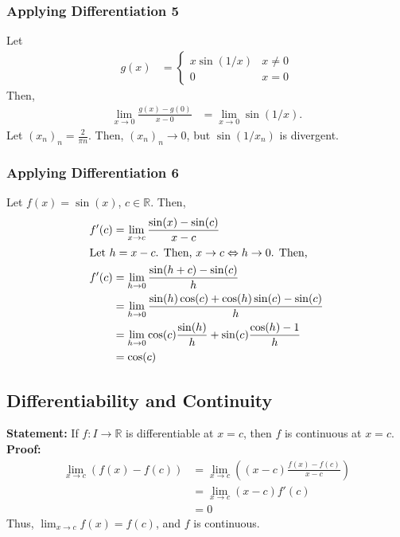 \documentclass[10pt]{extarticle}
\newcommand{\R}{\mathbb{R}}
\begin{document}
  \subsubsection{Applying Differentiation 5}%
    Let
    \begin{align*}
      g(x) &= \begin{cases}
        x\sin(1/x) & x\neq 0\\
        0 & x=0
      \end{cases}
    \end{align*}
    Then,
    \begin{align*}
      \lim_{x\rightarrow 0} \frac{g(x) - g(0)}{x-0} &= \lim_{x\rightarrow 0}\sin(1/x).
    \end{align*}
    Let $(x_n)_n = \frac{2}{\pi n}$. Then, $(x_n)_n \rightarrow 0$, but $\sin(1/x_n)$ is divergent.
  \subsubsection{Applying Differentiation 6}%
    Let $f(x) = \sin(x)$, $c\in\R$. Then,
    \begin{align*}
      f'(c) &= \lim_{x\rightarrow c} \frac{\sin(x) - \sin(c)}{x-c}\\
      \shortintertext{Let $h = x-c$. Then, $x\rightarrow c \Leftrightarrow h\rightarrow 0$. Then,}
      f'(c) &= \lim_{h\rightarrow 0}\frac{\sin(h+c) - \sin(c)}{h}\\
            &= \lim_{h\rightarrow 0}\frac{\sin(h)\cos(c) + \cos(h)\sin(c) - \sin(c)}{h}\\
            &= \lim_{h\rightarrow 0}\cos(c)\frac{\sin(h)}{h} + \sin(c)\frac{\cos(h) - 1}{h}\\
            &= \cos(c)
    \end{align*}
  \subsection{Differentiability and Continuity}%
    \textbf{Statement:} If $f: I\rightarrow \R$ is differentiable at $x=c$, then $f$ is continuous at $x=c$.\\

    \textbf{Proof:}
    \begin{align*}
      \lim_{x\rightarrow c}\left(f(x) - f(c)\right) &= \lim_{x\rightarrow c}\left(\left(x-c\right)\frac{f(x) - f(c)}{x-c}\right)\\
                                                    &= \lim_{x\rightarrow c}(x-c)f'(c)\\
                                                    &= 0
    \end{align*}
    Thus, $\lim_{x\rightarrow c}f(x) = f(c)$, and $f$ is continuous.
\end{document}
